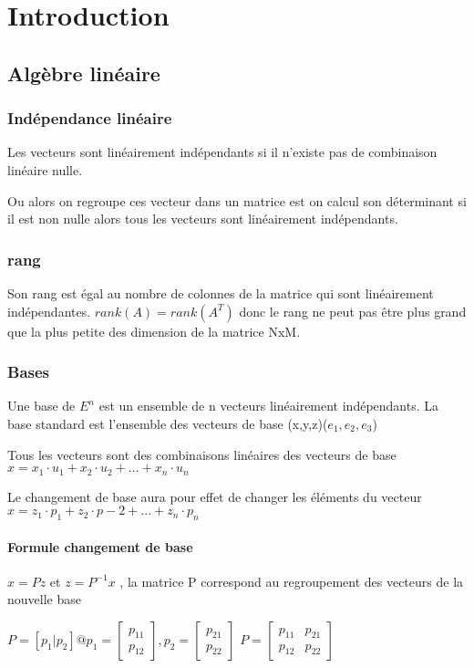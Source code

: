 \documentclass[resume]{subfiles}
\begin{document}
\section{Introduction}

\subsection{Algèbre linéaire}

\subsubsection{Indépendance linéaire}

Les vecteurs sont linéairement indépendants si il n'existe pas de combinaison linéaire nulle.

Ou alors on regroupe ces vecteur dans un matrice est on calcul son déterminant si il est non nulle alors tous les vecteurs sont linéairement indépendants.

\subsubsection{rang}
Son rang est égal au nombre de colonnes de la matrice qui sont linéairement indépendantes.
$rank(A) = rank(A^T)$ 
donc le rang ne peut pas être plus grand que la plus petite des dimension de la matrice NxM.

\subsubsection{Bases}

Une base de $E^n$ est un ensemble de n vecteurs linéairement indépendants.
La base standard est l'ensemble des vecteurs de base (x,y,z)($e_1,e_2,e_3$)

Tous les vecteurs sont des combinaisons linéaires des vecteurs de base 
$x=x_1\cdot u_1 + x_2\cdot u_2+...+x_n\cdot u_n$ 

Le changement de base aura pour effet de changer les éléments du vecteur 
$x = z_1\cdot p_1 + z_2\cdot p-2 +...+ z_n\cdot p_n$ 

\paragraph{Formule changement de base}


$x=Pz$ et $z=P^{-1}x$ , la matrice P correspond au regroupement des vecteurs de la nouvelle base

$P = [p_1|p_2] @ p_1=\begin{bmatrix} p_{11}\\ p_{12}\end{bmatrix},p_2=\begin{bmatrix} p_{21}\\ p_{22}\end{bmatrix}$ $P= \begin{bmatrix} 
p_{11}&p_{21}\\
p_{12}&p_{22}
\end{bmatrix}$ 
\end{document}
